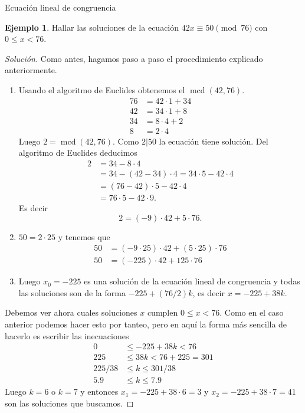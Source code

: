 \documentclass[11pt,spanish,makeidx]{amsbook}
\theoremstyle{definition}
\newtheorem{ejemplo}{Ejemplo}[section]
\theoremstyle{remark}
\newcommand \mcd{\operatorname{mcd}}
\begin{document}
\begin{section}{Ecuación lineal de congruencia}
\begin{ejemplo} Hallar las soluciones de la ecuación $42x\equiv
50 \pmod{76}$ con $0\le x< 76$.
\end{ejemplo}
\begin{proof}[Solución] Como antes, hagamos paso a paso el procedimiento explicado anteriormente.
\begin{enumerate}
\item 
Usando  el algoritmo de Euclides obtenemos el  $\mcd(42,76)$.
\begin{align*}
76 &=  42 \cdot 1 + 34 \\
42 &= 34 \cdot 1 + 8 \\
34 &= 8 \cdot 4 + 2 \\
8 &= 2 \cdot 4 
\end{align*}
Luego $2 = \mcd(42,76)$. Como $2|50$ la ecuación tiene solución. Del algoritmo de Euclides deducimos 
\begin{align*}
2 &= 34 - 8 \cdot 4\\
&= 34 - (42-34) \cdot 4 = 34\cdot 5 - 42\cdot 4\\
&= (76-42)\cdot 5 - 42\cdot 4 \\
&= 76\cdot 5 - 42\cdot 9. 
\end{align*}
Es decir
$$
2 = (-9) \cdot 42 + 5 \cdot 76.
$$

\item $50 = 2\cdot 25$ y tenemos  que 
\begin{align*}
50 &= (-9\cdot 25) \cdot 42 + (5 \cdot 25) \cdot 76 \\
50 &= (-225) \cdot 42 + 125 \cdot 76
\end{align*}
\item Luego $x_0 = -225$ es una solución de la ecuación lineal de congruencia y todas las soluciones son de la forma $-225 + (76/2)k$, es decir $x = -225 + 38k$.
\end{enumerate}
Debemos ver ahora cuales soluciones $x$ cumplen $0\le x< 76$. Como en el caso anterior podemos hacer esto por tanteo, pero en aquí la forma más sencilla de hacerlo es escribir las inecuaciones
\begin{align*}
0&\le -225 + 38k < 76 \\
225&\le 38k < 76+225= 301 \\
225/38 &\le k \le 301/38 \\
5.9 &\le k \le 7.9
\end{align*}
Luego $k = 6$ o $k =7$ y entonces $x_1 = -225 + 38\cdot 6 = 3$ y $x_2 = -225 + 38\cdot 7 = 41$ son las soluciones que buscamos. 
\end{proof}


\end{section}
\end{document}
